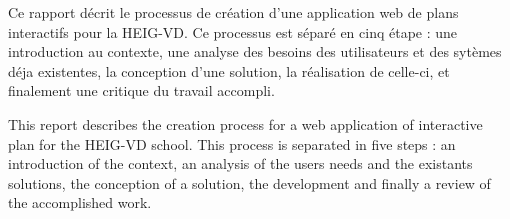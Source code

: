 Ce rapport décrit le processus de création d'une application web de plans interactifs pour la HEIG-VD.
Ce processus est séparé en cinq étape : une introduction au contexte,
une analyse des besoins des utilisateurs et des sytèmes déja existentes,
la conception d'une solution, la réalisation de celle-ci,
et finalement une critique du travail accompli.



\asterism

This report describes the creation process for a web application of interactive plan for the HEIG-VD school.
This process is separated in five steps : an introduction of the context,
an analysis of the users needs and the existants solutions,
the conception of a solution, the development
and finally a review of the accomplished work.